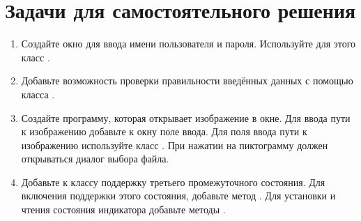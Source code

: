 \section{Задачи для самостоятельного решения}
\begin{enumerate}
\item Создайте окно для ввода имени пользователя и пароля. Используйте для этого класс .
\item Добавьте возможность проверки правильности введённых данных с помощью класса . 
\item Создайте программу, которая открывает изображение в окне. Для ввода пути к изображению добавьте к окну поле ввода.
Для поля ввода пути к изображению используйте класс . При нажатии на пиктограмму должен открываться
диалог выбора файла.
\item Добавьте к классу  поддержку третьего промежуточного состояния. Для включения поддержки этого
состояния, добавьте метод . Для установки и чтения состояния индикатора добавьте методы .
\end{enumerate}
